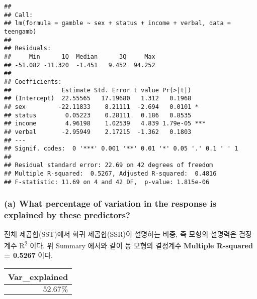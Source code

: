 \documentclass[
]{article}
\newenvironment{Shaded}{\begin{snugshade}}{\end{snugshade}}
\newcommand{\DataTypeTok}[1]{\textcolor[rgb]{0.13,0.29,0.53}{#1}}
\newcommand{\DecValTok}[1]{\textcolor[rgb]{0.00,0.00,0.81}{#1}}
\newcommand{\KeywordTok}[1]{\textcolor[rgb]{0.13,0.29,0.53}{\textbf{#1}}}
\newcommand{\NormalTok}[1]{#1}
\newcommand{\OperatorTok}[1]{\textcolor[rgb]{0.81,0.36,0.00}{\textbf{#1}}}
\newcommand{\StringTok}[1]{\textcolor[rgb]{0.31,0.60,0.02}{#1}}
\begin{document}
\begin{verbatim}
## 
## Call:
## lm(formula = gamble ~ sex + status + income + verbal, data = teengamb)
## 
## Residuals:
##     Min      1Q  Median      3Q     Max 
## -51.082 -11.320  -1.451   9.452  94.252 
## 
## Coefficients:
##              Estimate Std. Error t value Pr(>|t|)    
## (Intercept)  22.55565   17.19680   1.312   0.1968    
## sex         -22.11833    8.21111  -2.694   0.0101 *  
## status        0.05223    0.28111   0.186   0.8535    
## income        4.96198    1.02539   4.839 1.79e-05 ***
## verbal       -2.95949    2.17215  -1.362   0.1803    
## ---
## Signif. codes:  0 '***' 0.001 '**' 0.01 '*' 0.05 '.' 0.1 ' ' 1
## 
## Residual standard error: 22.69 on 42 degrees of freedom
## Multiple R-squared:  0.5267, Adjusted R-squared:  0.4816 
## F-statistic: 11.69 on 4 and 42 DF,  p-value: 1.815e-06
\end{verbatim}

\hypertarget{a-what-percentage-of-variation-in-the-response-is-explained-by-these-predictors}{%
\subsubsection{(a) What percentage of variation in the response is
explained by these
predictors?}\label{a-what-percentage-of-variation-in-the-response-is-explained-by-these-predictors}}

전체 제곱합(SST)에서 회귀 제곱합(SSR)이 설명하는 비중, 즉 모형의
설명력은 결정 계수 R\textsuperscript{2} 이다. 위 Summary 에서와 같이 동
모형의 결정계수 \textbf{Multiple R-squared = 0.5267} 이다.

\begin{Shaded}
\end{Shaded}

\captionsetup[table]{labelformat=empty,skip=1pt}
\begin{longtable}{r}
\toprule
Var\_explained \\ 
\midrule
$52.67\%$ \\ 
\bottomrule
\end{longtable}
\end{document}
